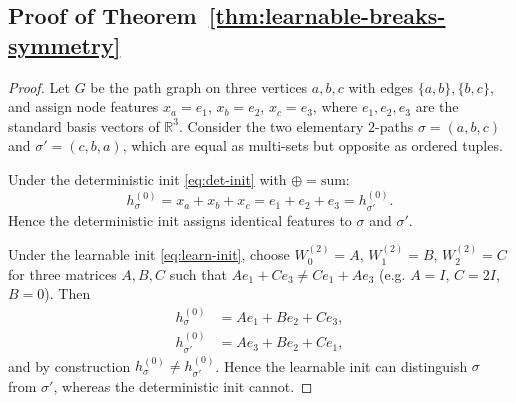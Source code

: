 \documentclass[letterpaper]{article} %
\begin{document}
\subsection{Proof of Theorem~\ref{thm:learnable-breaks-symmetry}} \label{app:proof-learnable}
\begin{proof}
    Let \(G\) be the path graph on three vertices \(a, b, c\) with edges \(\{a,b\}, \{b,c\}\), and assign node features \(x_a = e_1\), \(x_b = e_2\), \(x_c = e_3\), where \(e_1, e_2, e_3\) are the standard basis vectors of \(\mathbb{R}^3\). Consider the two elementary \(2\)-paths \(\sigma = (a, b, c)\) and \(\sigma' = (c, b, a)\), which are equal as multi-sets but opposite as ordered tuples.

    Under the deterministic init \eqref{eq:det-init} with \(\oplus = \text{sum}\):
    \[
        h_\sigma^{(0)} = x_a + x_b + x_c = e_1 + e_2 + e_3 = h_{\sigma'}^{(0)}.
    \]
    Hence the deterministic init assigns identical features to \(\sigma\) and \(\sigma'\).

    Under the learnable init \eqref{eq:learn-init}, choose \(W_0^{(2)} = A\), \(W_1^{(2)} = B\), \(W_2^{(2)} = C\) for three matrices \(A, B, C\) such that \(A e_1 + C e_3 \neq C e_1 + A e_3\) (e.g. \(A = I\), \(C = 2I\), \(B = 0\)). Then
    \begin{align*}
        h_\sigma^{(0)}  &= A e_1 + B e_2 + C e_3, \\
        h_{\sigma'}^{(0)} &= A e_3 + B e_2 + C e_1,
    \end{align*}
    and by construction \(h_\sigma^{(0)} \neq h_{\sigma'}^{(0)}\). Hence the learnable init can distinguish \(\sigma\) from \(\sigma'\), whereas the deterministic init cannot.
\end{proof}
\end{document}
